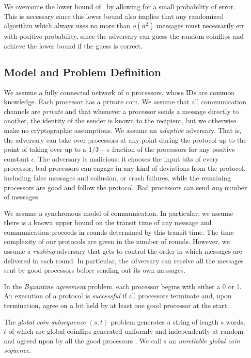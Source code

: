 \documentclass[letterpaper,11pt]{article}
\begin{document}
We overcome the lower bound of~\cite{DR} by allowing for a small probability of error.  This is necessary since this lower bound also implies that any randomized algorithm which always uses no more than $o(n^{2})$ messages must necessarily err with positive probability, since the adversary can guess the random coinflips
and achieve the lower bound if the guess is correct.




\subsection{Model and Problem Definition}
 We assume a fully connected network of $n$ processors, whose IDs are common knowledge.  Each processor has a private coin.  We assume that all communication channels are \emph{private} and that whenever a processor sends a message directly to another, the identity of the sender is known to the recipient, but we otherwise make no cryptographic assumptions.  We assume an {\it adaptive} adversary. That is, the adversary can take over processors at any point during the protocol up to the point of taking over up to a $1/3 - \epsilon$ fraction of the processors for any positive constant $\epsilon$.  The adversary is malicious: it  chooses the input bits of every processor,  bad processors can engage in any kind of deviations from the protocol, including false messages and collusion, or crash failures, while the remaining processors are good and follow the protocol. Bad processors can send {\it any} number of messages.

We assume a synchronous model of communication.  In particular, we assume there is a known upper bound on the transit time of any message and communication proceeds in rounds determined by this transit time.  The time complexity of our protocols are given in the number of rounds.  However, we assume a \emph{rushing} adversary that gets to control the order in which messages are delivered in each round.  In particular, the adversary can receive all the messages sent by good processors before sending out its own messages.

In the {\it  Byzantine agreement}  problem, each processor begins with either a 0 or 1. An execution of a protocol is {\it successful} if all processors  terminate and, upon termination, agree on a bit held by at least one good  processor at the start.  

The  {\it  global coin subsequence} $(s,t)$  problem  generates a string of length $s$ words, $t$ of  which are global coinflips generated uniformly and independently at random and agreed upon by all the good processors . We call $s$ an  {\it unreliable global coin sequence}.
\end{document}
